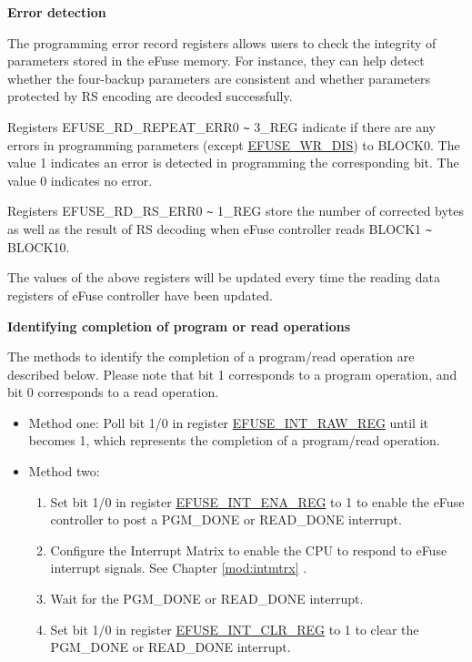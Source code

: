 \documentclass[main\_\_EN.tex]{subfiles}
\begin{document}
{\bfseries Error detection}

The programming error record registers allows users to check the integrity of parameters stored in the eFuse memory. For instance, they can help detect whether the four-backup parameters are consistent and whether parameters protected by RS encoding are decoded successfully.

Registers EFUSE\_RD\_REPEAT\_ERR0 \verb+~+ 3\_REG indicate if there are any errors in programming parameters (except \hyperref[fielddesc:EFUSEWRDIS]{EFUSE\_WR\_DIS}) to BLOCK0. The value 1 indicates an error is detected in programming the corresponding bit. The value 0 indicates no error.

Registers EFUSE\_RD\_RS\_ERR0 \verb+~+ 1\_REG store the number of corrected bytes as well as the result of RS decoding when eFuse controller reads BLOCK1 \verb+~+ BLOCK10.

The values of the above registers will be updated every time the reading data registers of eFuse controller have been updated.

{\bfseries Identifying completion of program or read operations}

The methods to identify the completion of a program/read operation are described below. Please note that bit 1 corresponds to a program operation, and bit 0 corresponds to a read operation.
\begin{itemize}
    \item Method one: Poll bit 1/0 in register \hyperref[regdesc:EFUSEINTRAWREG]{EFUSE\_INT\_RAW\_REG} until it becomes 1, which represents the completion of a program/read operation.
    \item Method two:
        \begin{enumerate}
            \item Set bit 1/0 in register \hyperref[regdesc:EFUSEINTENAREG]{EFUSE\_INT\_ENA\_REG} to 1 to enable the eFuse controller to post a PGM\_DONE or READ\_DONE interrupt.
            \item Configure the Interrupt Matrix to enable the CPU to respond to eFuse interrupt signals. See Chapter \ref{mod:intmtrx} \textit{}.
            \item Wait for the PGM\_DONE or READ\_DONE interrupt.
            \item Set bit 1/0 in register \hyperref[regdesc:EFUSEINTCLRREG]{EFUSE\_INT\_CLR\_REG} to 1 to clear the PGM\_DONE or READ\_DONE interrupt.
    \end{enumerate}
\end{itemize}
\end{document}

